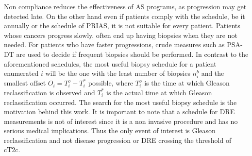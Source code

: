 Non compliance reduces the effectiveness of AS programs, as progression may get detected late. On the other hand even if patients comply with the schedule, be it annually or the schedule of PRIAS, it is not suitable for every patient. Patients whose cancers progress slowly, often end up having biopsies when they are not needed. For patients who have faster progressions, crude measures such as PSA-DT are used to decide if frequent biopsies should be performed. In contrast to the aforementioned schedules, the most useful biopsy schedule for a patient enumerated $i$ will be the one with the least number of biopsies $n_i^b$ and the smallest offset $O_i = T_i^o - T_i^*$ possible, where $T_i^o$ is the time at which Gleason reclassification is observed and $T_i^*$ is the actual time at which Gleason reclassification occurred. The search for the most useful biopsy schedule is the motivation behind this work. It is important to note that a schedule for DRE measurements is not of interest since it is a non invasive procedure and has no serious medical implications. Thus the only event of interest is Gleason reclassification and not disease progression or DRE crossing the threshold of cT2c.\\

